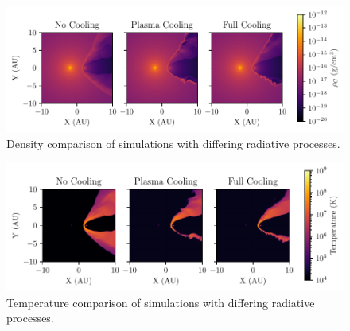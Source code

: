 \documentclass[fleqn,usenatbib]{mnras}
\begin{document}
\begin{figure}
  \centering
  \includegraphics[width=\linewidth]{assets/results/radiative/radiative-crop-2-rho.pdf}
  \caption[Density comparison of simulations with differing radiative processes]{Density comparison of simulations with differing radiative processes.}
  \label{fig:postshockcompression}
\end{figure}

\begin{figure}
  \centering
  \includegraphics[width=\linewidth]{assets/results/radiative/radiative-crop-2-temp.pdf}
  \caption[Temperature comparison of simulations with differing radiative processes]{Temperature comparison of simulations with differing radiative processes.}
  \label{fig:postshocktemperature}
\end{figure}
\end{document}
